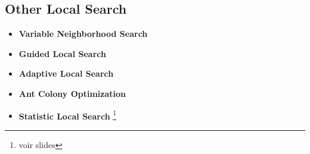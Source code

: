 	\subsection{Other Local Search}
		\begin{itemize}
			\item \textbf{Variable Neighborhood Search}
			\item \textbf{Guided Local Search}
			\item \textbf{Adaptive Local Search}
			\item \textbf{Ant Colony Optimization}
			\item \textbf{Statistic Local Search} \footnote{voir slides}
		\end{itemize}
		
	\newpage